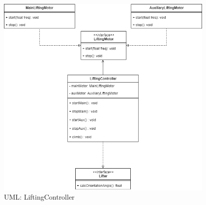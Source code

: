\begin{figure}[H]
  \includegraphics[width=0.95\textwidth]{img/softwarearchitektur/UML-LiftingController.png}
  \centering
  \caption{UML: LiftingController}
  \label{fig:uml-lifting-controller}
\end{figure}


